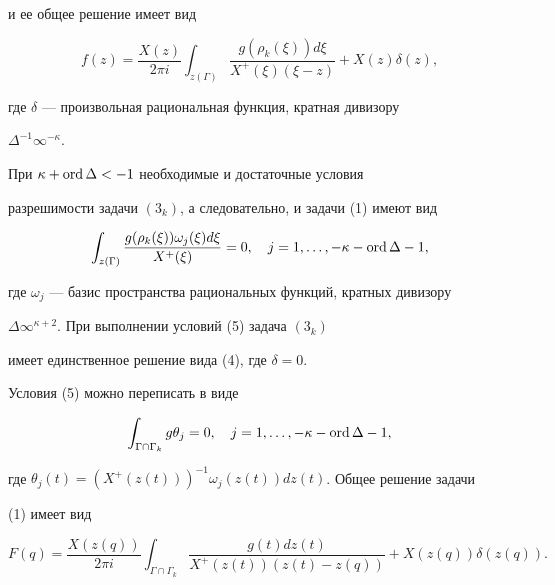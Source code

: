 и ее общее решение имеет вид


\begin{equation}


f(z)=\frac{X(z)}{2\pi i}\int_{z(\Gamma)}\frac{g(\rho_k(\xi))d\xi}


{X^+(\xi)(\xi -z)} +X(z)\delta (z),


\end{equation}


где $\delta$ --- произвольная рациональная функция, кратная дивизору


$\Delta^{-1}\infty^{-\kappa}$.





При $\kappa + \operatorname{ord}\Delta <-1$ необходимые и достаточные условия


разрешимости задачи $(3_k)$, а следовательно, и задачи (1) имеют вид


\begin{equation}


\int_{z(\Gamma)}\frac{g(\rho_k(\xi))\omega_j(\xi)d\xi}{X^+(\xi)}=0,


\quad j=1,\dotsc, -\kappa -\ord\Delta -1,


\end{equation}


где $\omega_j$ --- базис пространства рациональных функций, кратных дивизору


$\Delta\infty^{\kappa +2}$. При выполнении условий (5) задача $(3_k)$


имеет единственное решение вида (4), где $\delta =0$.





Условия (5) можно переписать в виде


\begin{equation}


\int_{\Gamma\cap\Gamma_k}g\theta_j=0,\quad j=1,


\dotsc,-\kappa -\ord\Delta -1,


\end{equation}


где $\theta_j(t)=(X^+(z(t)))^{-1}\omega_j(z(t))dz(t)$. Общее решение задачи


(1) имеет вид


\begin{equation}


F(q)=\frac{X(z(q))}{2\pi i}\int_{\Gamma\cap\Gamma_k}\frac{g(t)dz(t)}


{X^+(z(t))(z(t)-z(q))}+X(z(q))\delta(z(q)).


\end{equation}


